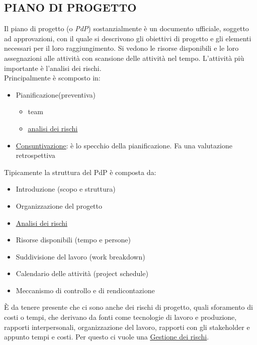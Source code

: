 		\subsection{PIANO DI PROGETTO}  \label{piano}
		Il piano di progetto (o \textit{PdP}) sostanzialmente è un documento ufficiale, soggetto ad approvazioni, con il quale si descrivono gli obiettivi di progetto e gli elementi necessari per il loro raggiungimento. Si vedono le risorse disponibili e le loro assegnazioni alle attività con scansione delle attività nel tempo. L'attività più importante è l'analisi dei rischi. \\
		Principalmente è scomposto in:
			\begin{itemize}
				\item Pianificazione(preventiva)
					\begin{itemize}
						\item team
						\item \underline{\hyperref[analisirischi]{analisi dei rischi}}
					\end{itemize}
				\item \underline{\hyperref[consuntivo]{Consuntivazione}}: è lo specchio della pianificazione. Fa una valutazione retrospettiva
			\end{itemize}
		Tipicamente la struttura del PdP è composta da:
			\begin{itemize}
				\item Introduzione (scopo e struttura)
				\item Organizzazione del progetto
				\item \underline{\hyperref[analisirischi]{Analisi dei rischi}}
				\item Risorse disponibili (tempo e persone)
				\item Suddivisione del lavoro (work breakdown)
				\item Calendario delle attività (project schedule)
				\item Meccanismo di controllo e di rendicontazione
			\end{itemize}
		È da tenere presente che ci sono anche dei rischi di progetto, quali sforamento di costi o tempi, che derivano da fonti come tecnologie di lavoro e produzione, rapporti interpersonali, organizzazione del lavoro, rapporti con gli stakeholder e appunto tempi e costi. Per questo ci vuole una \underline{\hyperref[gestionerischi]{Gestione dei rischi}}.



